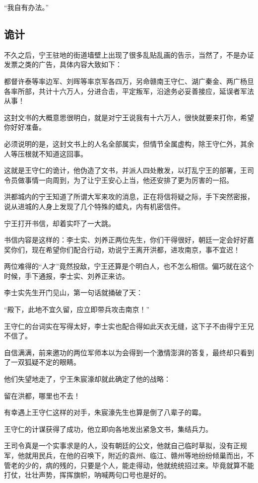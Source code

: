 \begin{multicols}{\theparacolNo}
		“我自有办法。”

		\subsection{诡计}
		不久之后，宁王驻地的街道墙壁上出现了很多乱贴乱画的告示，当然了，不是办证发票之类的广告，具体内容大致如下：

		都督许泰等率边军、刘晖等率京军各四万，另命赣南王守仁、湖广秦金、两广杨旦各率所部，共计十六万人，分进合击，平定叛军，沿途务必妥善接应，延误者军法从事！

		这封文书的大概意思很明白，就是对宁王说我有十六万人，很快就要来打你，希望你好好准备。

		必须说明的是，这封文书上的人名全部属实，但情节全属虚构，除王守仁外，其余人等压根就不知道这回事。

		这就是王守仁的诡计，他伪造了文书，并派人四处散发，以打乱宁王的部署，王司令员做事情一向周到，为了让宁王安心上当，他还安排了更为厉害的一招。

		洪都城内的宁王知道了所谓大军来攻的消息，正在将信将疑之际，手下突然密报，说从进城的人身上发现了几个特殊的蜡丸，内有机密信件。

		宁王打开书信，却着实吓了一大跳。

		书信内容是这样的：李士实、刘养正两位先生，你们干得很好，朝廷一定会好好嘉奖你们，现在希望你们配合行动，劝说宁王离开洪都，进攻南京，事不宜迟！

		两位难得的“人才”竟然投敌，宁王还算是个明白人，也不怎么相信。偏巧就在这个时候，手下通报，李士实、刘养正来访。

		李士实先生开门见山，第一句话就捅破了天：

		“殿下，此地不宜久留，应立即带兵攻击南京！”

		王守仁的台词实在写得太好，李士实也配合得如此天衣无缝，这下子不由得宁王兄不信了。

		自信满满，前来邀功的两位军师本以为会得到一个激情澎湃的答复，最终却只看到了一双狐疑不定的眼睛。

		他们失望地走了，宁王朱宸濠却就此确定了他的战略：

		留在洪都，哪里也不去！

		有幸遇上王守仁这样的对手，朱宸濠先生也算是倒了八辈子的霉。

		王守仁的计谋获得了成功，他立即向各地发出紧急文书，集结兵力。

		王司令真是一个实事求是的人，没有朝廷的公文，他就自己临时草拟，没有正规军，他就用民兵，在他的召唤下，附近的袁州、临江、赣州等地纷纷倾巢而出，不管老的少的，病的残的，只要是个人，能走得动，他就统统招过来。毕竟就算不能打仗，壮壮声势，挥挥旗帜，呐喊两句口号也是好的。


\end{multicols}
